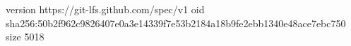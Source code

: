 version https://git-lfs.github.com/spec/v1
oid sha256:50b2f962c9826407e0a3e14339f7e53b2184a18b9fe2ebb1340e48ace7ebc750
size 5018
